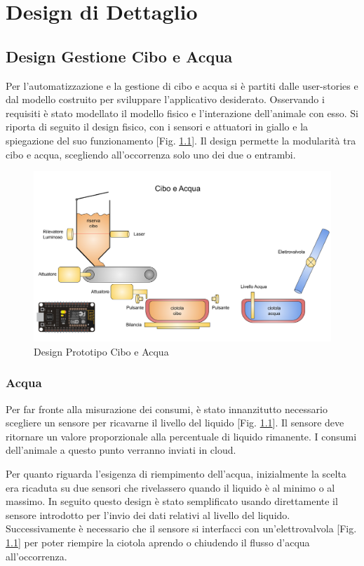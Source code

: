\chapter{Design di Dettaglio}

\section{Design Gestione Cibo e Acqua}
    Per l'automatizzazione e la gestione di cibo e acqua si è partiti dalle user-stories e dal modello costruito per sviluppare l'applicativo desiderato. Osservando i requisiti è stato modellato il modello fisico e l'interazione dell'animale con esso. 
    Si riporta di seguito il design fisico, con i sensori e attuatori in giallo e la spiegazione del suo funzionamento [Fig. \ref{fig:ciboacqua}].
    Il design permette la modularità tra cibo e acqua, scegliendo all'occorrenza solo uno dei due o entrambi.
    \begin{figure}[H]
        \caption{Design Prototipo Cibo e Acqua}
        \label{fig:ciboacqua}
        \centering
        \includegraphics[width=1\textwidth]{Images/CiboAcqua.png}
    \end{figure}
    
    \subsection{Acqua}
    Per far fronte alla misurazione dei consumi, è stato innanzitutto necessario scegliere un sensore per ricavarne il livello del liquido [Fig. \ref{fig:ciboacqua}]. Il sensore deve ritornare un valore proporzionale alla percentuale di liquido rimanente. I consumi dell'animale a questo punto verranno inviati in cloud.
    
    Per quanto riguarda l'esigenza di riempimento dell'acqua, inizialmente la scelta era ricaduta su due sensori che rivelassero quando il liquido è al minimo o al massimo. In seguito questo design è stato semplificato usando direttamente il sensore introdotto per l'invio dei dati relativi al livello del liquido. 
    Successivamente è necessario che il sensore si interfacci con un'elettrovalvola [Fig. \ref{fig:ciboacqua}] per poter riempire la ciotola aprendo o chiudendo il flusso d'acqua all'occorrenza. 
    
